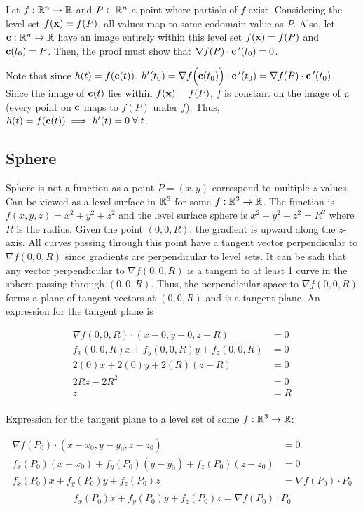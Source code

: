 Let $f:\mathbb{R}^n\to \mathbb{R}$ and $P\in \mathbb{R}^n$ a point where partials of $f$ exist. Considering the level set $f(\textbf{x})=f(P)$,
all values map to same codomain value as $P$. Also, let $\textbf{c}:\mathbb{R}^n\to \mathbb{R}$ have an image entirely within this level set $f(\textbf{x})=f(P)$
and $\textbf{c}(t_0)=P$. Then, the proof must show that $\nabla f(P)\cdot \textbf c\,'(t_0)=0$.

Note that since $h(t)=f(\textbf{c}(t))$, $h'(t_0)=\nabla f \Big(\textbf c (t_0) \Big)\cdot \textbf c\,'(t_0)=\nabla f (P)\cdot  \textbf c\,'(t_0)$.
Since the image of $\textbf{c}(t)$ lies within $f(\textbf{x})=f(P)$, $f$ is constant on the image of $\textbf{c}$ (every point on $\textbf{c}$ maps to $f(P)$ under $f$).
Thus, $h(t)=f(\textbf{c}(t))\implies h'(t)=0\;\forall\;t$.

\subsection{Sphere}

Sphere is not a function as a point $P=(x,y)$ correspond to multiple $z$ values.
Can be viewed as a level surface in $\mathbb{R}^3$ for some $f:\mathbb{R}^3\to \mathbb{R}$. The function is $f(x,y,z)=x^2+y^2+z^2$
and the level surface sphere is $x^2+y^2+z^2=R^2$ where $R$ is the radius.
Given the point $(0,0,R)$, the gradient is upward along the $z$-axis. All curves passing through this point
have a tangent vector perpendicular to $\nabla f(0,0,R)$ since gradients are perpendicular to level sets.
It can be sadi that any vector perpendicular to $\nabla f(0,0,R)$ is a tangent to at least 1 curve in the sphere passing through $(0,0,R)$.
Thus, the perpendicular space to $\nabla f(0,0,R)$ forms a plane of tangent vectors at $(0,0,R)$ and is a tangent plane.
An expression for the tangent plane is 

\begin{align*}
    \nabla f (0,0,R)\cdot(x-0, y-0, z-R)&=0\\
    f_x(0,0,R)x+f_y(0,0,R)y+f_z(0,0,R)&=0\\
    2(0)x+2(0)y+2(R)(z-R)&=0\\
    2Rz-2R^2&=0\\
    z&=R\\
\end{align*}

Expression for the tangent plane to a level set of some $f:\mathbb{R}^3\to \mathbb{R}$:

\begin{align*}
    \nabla f (P_0)\cdot(x-x_0, y-y_0,z- z_0)&=0\\
    f_x(P_0)(x-x_0)+f_y(P_0)(y-y_0)+f_z(P_0)(z-z_0)&=0\\
    f_x(P_0)x+f_y(P_0)y+f_z(P_0)z&=\nabla f(P_0)\cdot P_0\\
\end{align*}
$$\boxed{f_x(P_0)x+f_y(P_0)y+f_z(P_0)z=\nabla f(P_0)\cdot P_0}$$